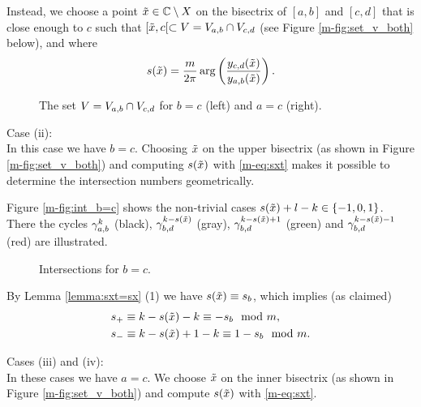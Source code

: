 \documentclass[main.tex]{subfiles}
\begin{document}
 Instead, we choose a point $\tilde{x} \in \mathbb{C} \setminus X$ on the bisectrix of
  $[a,b]$ and $[c,d]$ that is close enough to $c$ such that $[\tilde{x},c[ \subset V = V_{a,b} \cap V_{c,d}$
  (see Figure \ref{m-fig:set_v_both} below), and where
  \begin{equation}\label{eq:sxt}
   s(\tilde{x}) = \frac{m}{2\pi} \arg \left( \frac{y_{c,d}(\tilde{x})}{y_{a,b}(\tilde{x})} \right).
  \end{equation}
    \begin{figure}[H]
      \begin{center}
   \scalebox{.9}{}
      \end{center}
     \vspace{-1cm}
    \caption{The set $V = V_{a,b} \cap V_{c,d}$ for $b=c$ (left) and $a=c$ (right).}
    \label{fig:set_v_both}
   \end{figure}

   Case (ii): \\
   In this case we have $b = c$. Choosing $\tilde{x}$ on the upper bisectrix (as shown in Figure \ref{m-fig:set_v_both})
   and computing $s(\tilde{x})$ with \eqref{m-eq:sxt} makes it possible to determine the intersection numbers geometrically.

   Figure \ref{m-fig:int_b=c} shows the non-trivial cases $s(\tilde{x}) + l - k \in \{-1,0,1\}$.
   There the cycles $\gamma_{a,b}^k$ (black), $\gamma_{b,d}^{k-s(\tilde{x})}$ (gray), $\gamma_{b,d}^{k-s(\tilde{x}) + 1 }$ (green) and
    $\gamma_{b,d}^{k-s(\tilde{x})-1}$ (red) are illustrated.
    \begin{figure}[H]
      \begin{center}
   \scalebox{0.8}{}
      \end{center}
    \caption{Intersections for $b=c$.}
    \label{fig:int_b=c}
   \end{figure}
    By Lemma \ref{lemma:sxt=sx} (1) we have $s(\tilde{x}) \equiv s_b$, which implies (as claimed)
    \begin{align*}
    & s_+ \equiv k-s(\tilde{x})-k \equiv -s_b \mod m, \\
    & s_- \equiv k-s(\tilde{x})+1-k \equiv 1-s_b \mod m.
    \end{align*}

 Cases (iii) and  (iv): \\
 In these cases we have $a = c$. We choose $\tilde{x}$ on the inner bisectrix (as shown in Figure \ref{m-fig:set_v_both})
   and compute $s(\tilde{x})$ with \eqref{m-eq:sxt}.
\end{document}
